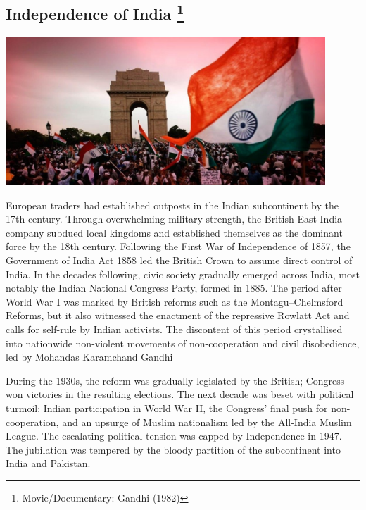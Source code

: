\documentclass[11pt]{report}
\begin{document}
\subsection{Independence of India \protect\footnote{Movie/Documentary: Gandhi (1982)}}
\vspace{2mm}\begin{center}\includegraphics[width=12cm]{./img/independenceIndia.jpg}\end{center}
European traders had established outposts in the Indian subcontinent by the 17th century. Through overwhelming military strength, the British East India company subdued local kingdoms and established themselves as the dominant force by the 18th century. Following the First War of Independence of 1857, the Government of India Act 1858 led the British Crown to assume direct control of India. In the decades following, civic society gradually emerged across India, most notably the Indian National Congress Party, formed in 1885. The period after World War I was marked by British reforms such as the Montagu–Chelmsford Reforms, but it also witnessed the enactment of the repressive Rowlatt Act and calls for self-rule by Indian activists. The discontent of this period crystallised into nationwide non-violent movements of non-cooperation and civil disobedience, led by Mohandas Karamchand Gandhi

During the 1930s, the reform was gradually legislated by the British; Congress won victories in the resulting elections. The next decade was beset with political turmoil: Indian participation in World War II, the Congress' final push for non-cooperation, and an upsurge of Muslim nationalism led by the All-India Muslim League. The escalating political tension was capped by Independence in 1947. The jubilation was tempered by the bloody partition of the subcontinent into India and Pakistan.
\end{document}

